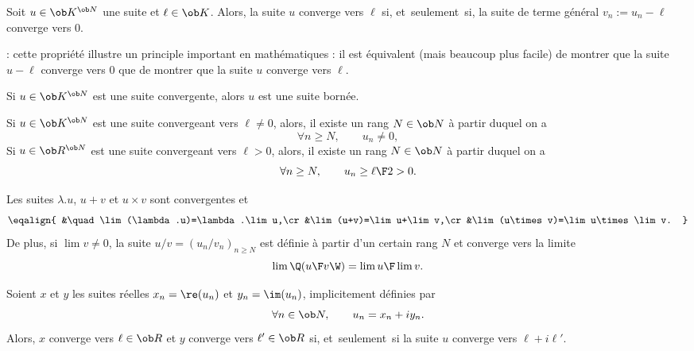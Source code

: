 {}
\bigskip

\Propriete []  Soit $u\in\ob K^{\ob N}$ une suite et $\ell\in\ob K$. Alors, la suite $u$ converge vers $\ell$ si, et~seulement~si, 
la suite de terme g\'en\'eral $v_n:=u_n-\ell$ converge vers $0$. 
\bigskip

\Remarque : cette propri\'et\'e illustre un principle important en math\'ematiques : il est \'equivalent (mais beaucoup plus facile) de montrer que la suite $u-\ell$ converge vers $0$ que de montrer que la suite $u$ converge vers $\ell$. 
\bigskip

\Propriete []  Si $u\in \ob K^{\ob N}$ est une suite convergente, alors $u$ est une suite born\'ee. 
\bigskip

\Propriete []  Si $u\in\ob K^{\ob N}$ est une suite convergeant vers $\ell\neq 0$, alors, il existe un rang $N\in\ob N$ \`a partir duquel on a 
$$
\forall n\ge N,\qquad u_n\neq0, 
$$
Si $u\in\ob R^{\ob N}$ est une suite convergeant vers $\ell> 0$, alors, il existe un rang $N\in\ob N$ \`a partir duquel on a 
$$
\forall n\ge N,\qquad u_n\ge{\ell\F 2}>0. 
$$

Les suites $\lambda.u$, $u+v$ et $u\times v$ sont convergentes et 
$$
\eqalign{
&\quad\lim(\lambda.u)=\lambda.\lim u,\cr
&\lim(u+v)=\lim u+\lim v,\cr
&\lim(u\times v)=\lim u\times\lim v.
}
$$
De plus, si $\lim v\neq 0$, la suite $u/v=(u_n/v_n)_{n\ge N}$ est d\'efinie \`a partir d'un certain rang $N$ et converge vers la limite 
$$
{\lim\Q({u\F v}\W)={\lim u\F\lim v}}.
$$

Soient $x$ et $y$  les suites r\'eelles $x_n=\re(u_n)$ et $y_n=\im(u_n)$, implicitement d\'efinies par
$$
\forall n\in\ob N,\qquad u_n=x_n+iy_n.
$$
Alors, $x$ converge vers $\ell\in\ob R$ et $y$ converge vers $\ell'\in\ob R$ si, et~seulement~si la suite $u$ converge vers $\ell+i\ell'$. 

